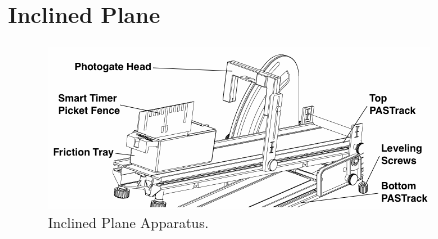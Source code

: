 \subsection{Inclined Plane}
\begin{figure}[h]
    \begin{center}
        \includegraphics[width=0.9\textwidth]{./Exp1-4/pic/apparatus.png}
    \end{center}
    \caption{Inclined Plane Apparatus.}
    \label{fig:apparatusplane}
\end{figure}

